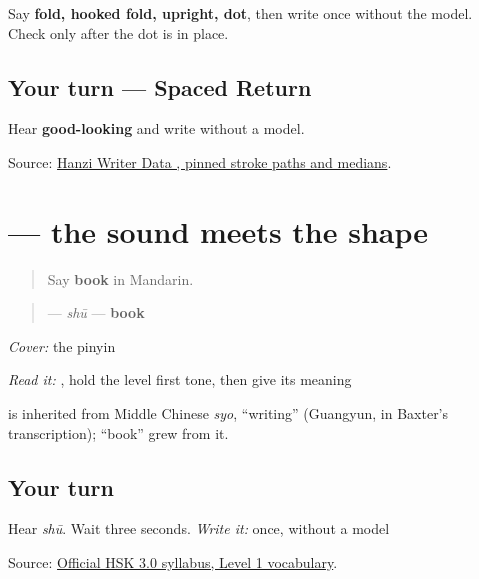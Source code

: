 Say \textbf{fold, hooked fold, upright, dot}, then write \textbf{} once without the model. Check only after the dot is in place.

\subsection*{Your turn — Spaced Return}
Hear \textbf{good-looking} and write  without a model.

\begin{tcolorbox}[breakable,colback=teal!4,colframe=teal!35!black,title={Before you move on}]
Source: \href{https://raw.githubusercontent.com/chanind/hanzi-writer-data/68d10a4b21150cae5e1ebbd223eed289cf32d90c/data/\%E4\%B9\%A6.json}{Hanzi Writer Data , pinned stroke paths and medians}.
\end{tcolorbox}
\section[\texorpdfstring{\zh{书} (shū)}{书 (shū)}]{ — the sound meets the shape}

\label{lesson:ZH-C18-shu}



\begin{quote}
Say \textbf{book} in Mandarin.
\end{quote}

\begin{cousinweb}
\begin{quote}
\textbf{} — \emph{shū} — \textbf{book}
\end{quote}

\emph{Cover:} the pinyin

\emph{Read it:} , hold the level first tone, then give its meaning

\textbf{} is inherited from Middle Chinese \emph{syo}, \textquotedblleft{}writing\textquotedblright{} (Guangyun, in Baxter's transcription); \textquotedblleft{}book\textquotedblright{} grew from it.
\end{cousinweb}

\subsection*{Your turn}
Hear \emph{shū}. Wait three seconds. \emph{Write it:} \textbf{} once, without a model

\begin{tcolorbox}[breakable,colback=teal!4,colframe=teal!35!black,title={Before you move on}]
Source: \href{https://hsk.cn-bj.ufileos.com/3.0/\%E6\%96\%B0\%E7\%89\%88HSK\%E8\%80\%83\%E8\%AF\%95\%E5\%A4\%A7\%E7\%BA\%B21219.pdf}{Official HSK 3.0 syllabus, Level 1 vocabulary}.
\end{tcolorbox}

